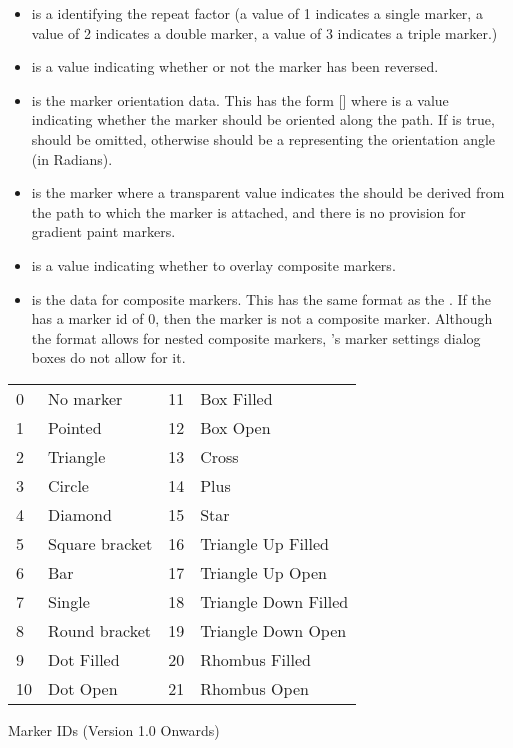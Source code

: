 \begin{numbered}
\begin{enumerate}
\begin{enumerate}
\begin{itemize}
      \item {} is a  identifying the repeat factor
      (a value of 1 indicates a single marker, a value of 2 indicates
      a double marker, a value of 3 indicates a triple marker.)

      \item {} is a  value indicating whether
      or not the marker has been reversed.

      \item {} is the marker orientation data. This has
      the form  [] where 
      is a  value indicating whether the marker should be
      oriented along the path. If  is true, 
      should be omitted, otherwise  should be a 
      representing the orientation angle (in Radians).

      \item {} is the marker  where
      a transparent value indicates the  should be derived from
      the path to which the marker is attached, and there is no provision
      for gradient paint markers.

      \item {} is a  value indicating whether
      to overlay composite markers.

      \item {} is the data for composite markers.
      This has the same format as the . If the
       has a marker id of 0, then the marker
      is not a composite marker. Although the format allows for nested
      composite markers, \FlowframTk's marker settings dialog boxes do not
      allow for it.
      \end{itemize}

{%
    \begin{tabular}{llll}
    0 & No marker &
    11 & Box Filled\\
    1 & Pointed &
    12 & Box Open\\
    2 & Triangle &
    13 & Cross \\
    3 & Circle &
    14 & Plus\\
    4 & Diamond &
    15 & Star\\
    5 & Square bracket &
    16 & Triangle Up Filled\\
    6 & Bar &
  17 & Triangle Up Open\\
  7 & Single &
  18 & Triangle Down Filled\\
  8 & Round bracket &
  19 & Triangle Down Open\\
  9 & Dot Filled &
  20 & Rhombus Filled \\
  10 & Dot Open &
  21 & Rhombus Open
  \end{tabular}
}
{Marker IDs (Version 1.0 Onwards)}


\end{enumerate}
\end{enumerate}
\end{numbered}
